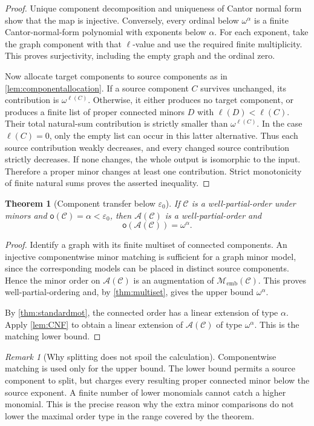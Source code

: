 \documentclass[11pt,letterpaper]{article}
\theoremstyle{plain}
\newtheorem{theorem}{Theorem}[section]
\theoremstyle{definition}
\theoremstyle{remark}
\newtheorem{remark}[remark]{Remark}
\newcommand{\mot}{\mathsf o}
\newcommand{\Memb}{\mathcal M_{\mathrm{emb}}}
\newcommand{\Cl}{\mathcal C}
\newcommand{\Add}{\mathcal A}
\newcommand{\eps}{\varepsilon}
\begin{document}
\begin{proof}
Unique component decomposition and uniqueness of Cantor normal form show
that the map is injective. Conversely, every ordinal below
$\omega^\alpha$ is a finite Cantor-normal-form polynomial with exponents
below $\alpha$. For each exponent, take the graph component with that
$\ell$-value and use the required finite multiplicity. This proves
surjectivity, including the empty graph and the ordinal zero.

Now allocate target components to source components as in
\cref{lem:componentallocation}. If a source component $C$ survives
unchanged, its contribution is $\omega^{\ell(C)}$. Otherwise, it either
produces no target component, or produces a finite list of proper
connected minors $D$ with $\ell(D)<\ell(C)$. Their total natural-sum
contribution is strictly smaller than $\omega^{\ell(C)}$. In the case
$\ell(C)=0$, only the empty list can occur in this latter alternative.
Thus each source contribution weakly decreases, and every changed
source contribution strictly decreases. If none changes, the whole
output is isomorphic to the input. Therefore a proper minor changes at
least one contribution. Strict monotonicity of finite natural sums
proves the asserted inequality.
\end{proof}

\begin{theorem}[Component transfer below $\eps_0$]\label{thm:component}
If $\Cl$ is a well-partial-order under minors and
$\mot(\Cl)=\alpha<\eps_0$, then $\Add(\Cl)$ is a well-partial-order and
\[
 \boxed{\mot(\Add(\Cl))=\omega^\alpha.}
\]
\end{theorem}

\begin{proof}
Identify a graph with its finite multiset of connected components.
An injective componentwise minor matching is sufficient for a graph
minor model, since the corresponding models can be placed in distinct
source components. Hence the minor order on $\Add(\Cl)$ is an
augmentation of $\Memb(\Cl)$. This proves well-partial-ordering and,
by \cref{thm:multiset}, gives the upper bound $\omega^\alpha$.

By \cref{thm:standardmot}, the connected order has a linear extension
of type $\alpha$. Apply \cref{lem:CNF} to obtain a linear extension of
$\Add(\Cl)$ of type $\omega^\alpha$. This is the matching lower bound.
\end{proof}

\begin{remark}[Why splitting does not spoil the calculation]
Componentwise matching is used only for the upper bound. The lower bound
permits a source component to split, but charges every resulting proper
connected minor below the source exponent. A finite number of lower
monomials cannot catch a higher monomial. This is the precise reason why
the extra minor comparisons do not lower the maximal order type in the
range covered by the theorem.
\end{remark}
\end{document}
